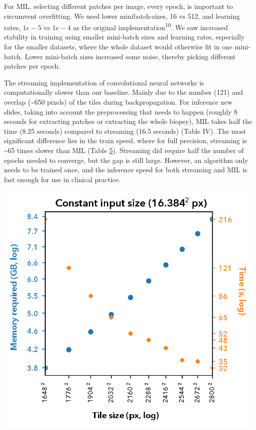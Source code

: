 \documentclass[
  12pt,
  a5,margin=2cmpaper,
]{article}
\begin{document}
For MIL, selecting different patches per image, every epoch, is
important to circumvent overfitting. We used lower minibatch-sizes, 16
vs 512, and learning rates, \(1e-5\) vs \(1e-4\) as the original
implementation\textsuperscript{10}. We saw increased stability in
training using smaller mini-batch sizes and learning rates, especially
for the smaller datasets, where the whole dataset would otherwise fit in
one mini-batch. Lower mini-batch sizes increased some noise, thereby
picking different patches per epoch.

The streaming implementation of convolutional neural networks is
computationally slower than our baseline. Mainly due to the number (121)
and overlap (\textasciitilde650 pixels) of the tiles during
backpropagation. For inference new slides, taking into account the
preprocessing that needs to happen (roughly 8 seconds for extracting
patches or extracting the whole biopsy), MIL takes half the time (8.25
seconds) compared to streaming (16.5 seconds) (Table IV). The most
significant difference lies in the train speed, where for full
precision, streaming is \textasciitilde65 times slower than MIL (Table
\protect\hyperlink{tab:times}{5}). Streaming did require half the number
of epochs needed to converge, but the gap is still large. However, an
algorithm only needs to be trained once, and the inference speed for
both streaming and MIL is fast enough for use in clinical practice.

\includegraphics{chpt3_imgs/timevsmemory_final.png}
\end{document}
